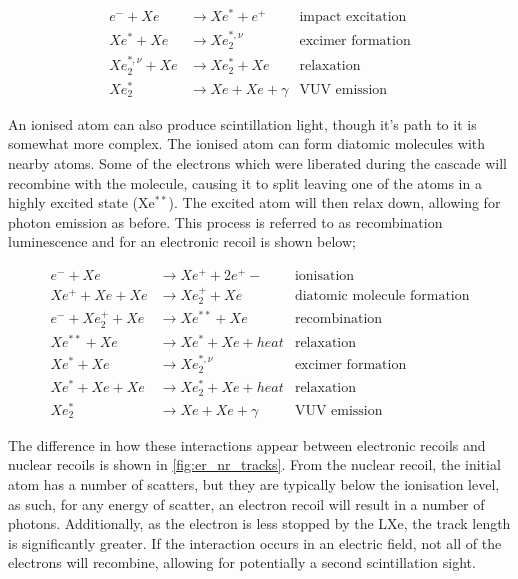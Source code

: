 \begin{align*}
    e^- + Xe &\rightarrow Xe^* + e^+  &\text{impact excitation} \\ 
    Xe^* + Xe &\rightarrow Xe_2^{*,\nu} &\text{excimer formation} \\
    Xe_2^{*,\nu} + Xe &\rightarrow Xe_2^* + Xe &\text{relaxation} \\
    Xe_2^* &\rightarrow Xe + Xe + \gamma &\text{VUV emission} 
\end{align*}

\par
An ionised atom can also produce scintillation light, though it's path to it is somewhat more complex.
The ionised atom can form diatomic molecules with nearby atoms.
Some of the electrons which were liberated during the cascade will recombine with the molecule, causing it to split leaving one of the atoms in a highly excited state (Xe$^{**}$).
The excited atom will then relax down, allowing for photon emission as before.
This process is referred to as recombination luminescence and for an electronic recoil is shown below;

\begin{align*}
    e^- + Xe &\rightarrow Xe^+ + 2e^+- &\text{ionisation} \\ 
    Xe^+ + Xe + Xe &\rightarrow Xe_2^{+} + Xe &\text{diatomic molecule formation} \\
    e^- + Xe_2^+ + Xe&\rightarrow Xe^{**} + Xe &\text{recombination} \\
    Xe^{**} + Xe &\rightarrow Xe^{*} + Xe + heat &\text{relaxation} \\
    Xe^{*} + Xe  &\rightarrow Xe_2^{*,\nu} &\text{excimer formation} \\
    Xe^{*} + Xe + Xe &\rightarrow Xe_2^{*} + Xe + heat &\text{relaxation} \\
    Xe_2^* &\rightarrow Xe + Xe + \gamma &\text{VUV emission} 
\end{align*}

\par
The difference in how these interactions appear between electronic recoils and nuclear recoils is shown in \autoref{fig:er_nr_tracks}.
From the nuclear recoil, the initial atom has a number of scatters, but they are typically below the ionisation level, as such, for any energy of scatter, an electron recoil will result in a number of photons.
Additionally, as the electron is less stopped by the LXe, the track length is significantly greater.
If the interaction occurs in an electric field, not all of the electrons will recombine, allowing for potentially a second scintillation sight.

